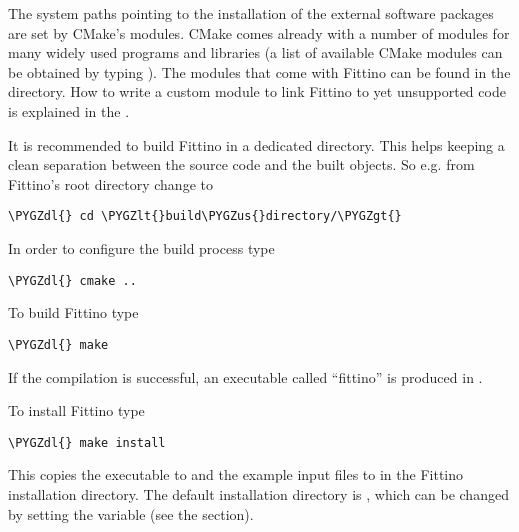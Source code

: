 \documentclass[letterpaper,10pt,english]{sphinxmanual}
\def\PYGZus{\char`\_}
\def\PYGZlt{\char`\<}
\def\PYGZgt{\char`\>}
\def\PYGZdl{\char`\$}
\begin{document}
The system paths pointing to the installation of the external software packages are set by CMake's
 modules. CMake comes already with a number of  modules for many
widely used programs and libraries (a list of available CMake modules can be obtained by typing
). The  modules that come with Fittino can be found in
the  directory.  How to write a custom  module to link Fittino to
yet unsupported code is explained in the .

It is recommended to build Fittino in a dedicated directory. This helps keeping a clean separation
between the source code and the built objects. So e.g. from Fittino’s root directory change to

\begin{Verbatim}[commandchars=\\\{\}]
\PYGZdl{} cd \PYGZlt{}build\PYGZus{}directory/\PYGZgt{}
\end{Verbatim}

In order to configure the build process type

\begin{Verbatim}[commandchars=\\\{\}]
\PYGZdl{} cmake ..
\end{Verbatim}

To build Fittino type

\begin{Verbatim}[commandchars=\\\{\}]
\PYGZdl{} make
\end{Verbatim}

If the compilation is successful, an executable called ``fittino'' is produced in
.

To install Fittino type

\begin{Verbatim}[commandchars=\\\{\}]
\PYGZdl{} make install
\end{Verbatim}

This copies the executable to  and the example input files to 
in the Fittino installation directory. The default installation directory is , which
can be changed by setting the  variable (see the {\hyperref[troubleshooting:troubleshooting]{\emph{}}}
section).
\end{document}
